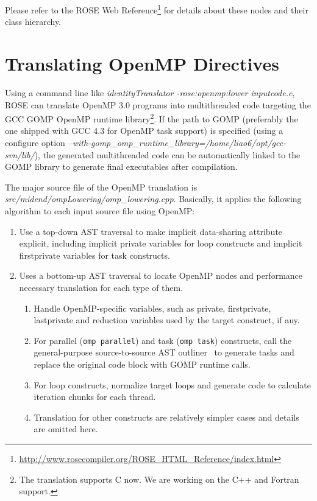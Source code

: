 Please refer to the ROSE Web Reference\footnote{\url{http://www.rosecompiler.org/ROSE_HTML_Reference/index.html}} for details about these nodes and their class hierarchy. 
\section{Translating OpenMP Directives}
Using a command line like \textit{identityTranslator -rose:openmp:lower inputcode.c},
ROSE can translate OpenMP 3.0 programs into multithreaded code targeting
the GCC GOMP OpenMP runtime library\footnote{The translation supports C
now. We are working on the C++ and Fortran support.}.
If the path to GOMP (preferably the one shipped with GCC 4.3 for OpenMP task support) is specified (using a configure option \textit{--with-gomp\_omp\_runtime\_library=/home/liao6/opt/gcc-svn/lib/}),
the generated multithreaded code can be automatically linked to the GOMP library to generate final executables after compilation. 

The major source file of the OpenMP translation is \textit{src/midend/ompLowering/omp\_lowering.cpp}. 
Basically, it applies the following algorithm to each input source file using OpenMP:
\begin{enumerate}
\item  Use a top-down AST traversal to make implicit data-sharing attribute explicit, including implicit private variables for loop constructs and implicit firstprivate variables for task constructs. 
\item  Uses a bottom-up AST traversal to locate OpenMP nodes and performance necessary translation for each type of them.
\begin{enumerate}
\item Handle OpenMP-specific variables, such as private, firstprivate, lastprivate and reduction variables used by the target construct, if any.
\item For parallel (\lstinline{omp parallel}) and task (\lstinline{omp task}) constructs, call the general-purpose source-to-source AST outliner~\cite{LiaoEffective2009} to generate tasks and replace the original code block with GOMP runtime calls.
\item For loop constructs, normalize target loops and generate code to
calculate iteration chunks for each thread.
\item Translation for other constructs are relatively simpler cases and
details are omitted here.
\end{enumerate}
\end{enumerate}

